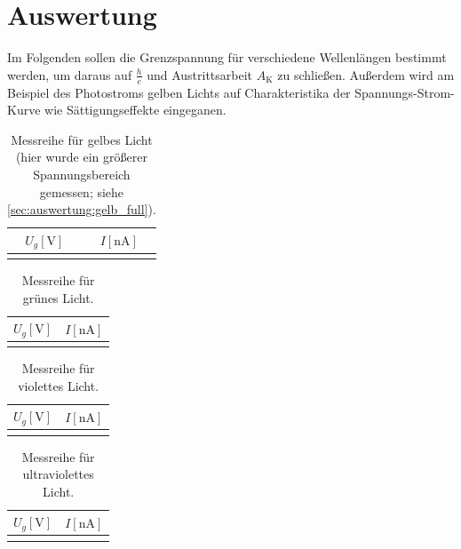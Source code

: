 \section{Auswertung} \label{sec:auswertung}

Im Folgenden sollen die Grenzspannung für verschiedene Wellenlängen bestimmt werden,
um daraus auf $\frac{h}{e}$ und Austrittsarbeit $A_\text{K}$ zu schließen.
Außerdem wird am Beispiel des Photostroms gelben Lichts
auf Charakteristika der Spannungs-Strom-Kurve wie Sättigungseffekte eingeganen.

\begin{table}
  \centering
  \caption{Messreihe für gelbes Licht (hier wurde ein größerer Spannungsbereich gemessen; siehe \autoref{sec:auswertung:gelb_full}).}
  \label{tab:werte_gelb}
  \begin{tabular}{S S}
  \toprule
  $U_g [\si{\volt}]$ &
  $I [\si{\nano\ampere}]$ \\
  \midrule
  \bottomrule
  \end{tabular}
\end{table}

\begin{table}
  \centering
  \caption{Messreihe für grünes Licht.}
  \label{tab:werte_gruen}
  \begin{tabular}{S S}
  \toprule
  $U_g [\si{\volt}]$ &
  $I [\si{\nano\ampere}]$ \\
  \midrule
  \bottomrule
  \end{tabular}
\end{table}

\begin{table}
  \centering
  \caption{Messreihe für violettes Licht.}
  \label{tab:werte_violett}
  \begin{tabular}{S S}
  \toprule
  $U_g [\si{\volt}]$ &
  $I [\si{\nano\ampere}]$ \\
  \midrule
  \bottomrule
  \end{tabular}
\end{table}

\begin{table}
  \centering
  \caption{Messreihe für ultraviolettes Licht.}
  \label{tab:werte_ultraviolett}
  \begin{tabular}{S S}
  \toprule
  $U_g [\si{\volt}]$ &
  $I [\si{\nano\ampere}]$ \\
  \midrule
  \bottomrule
  \end{tabular}
\end{table}

